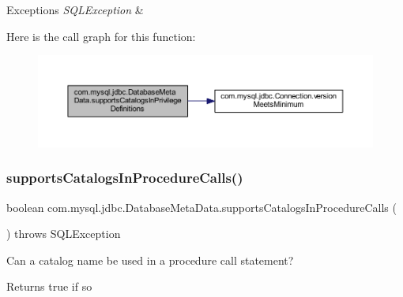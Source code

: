 \begin{DoxyExceptions}{Exceptions}
{\em S\+Q\+L\+Exception} & \\
\hline
\end{DoxyExceptions}
Here is the call graph for this function\+:
\nopagebreak
\begin{figure}[H]
\begin{center}
\leavevmode
\includegraphics[width=350pt]{classcom_1_1mysql_1_1jdbc_1_1_database_meta_data_abf583ff76a0cebb69d2483dc2227abe0_cgraph}
\end{center}
\end{figure}
\mbox{\label{classcom_1_1mysql_1_1jdbc_1_1_database_meta_data_a709d1b7e39661466b4742e85e40823d9}} 
\subsubsection{\texorpdfstring{supports\+Catalogs\+In\+Procedure\+Calls()}{supportsCatalogsInProcedureCalls()}}
{\footnotesize\ttfamily boolean com.\+mysql.\+jdbc.\+Database\+Meta\+Data.\+supports\+Catalogs\+In\+Procedure\+Calls (\begin{DoxyParamCaption}{ }\end{DoxyParamCaption}) throws S\+Q\+L\+Exception}

Can a catalog name be used in a procedure call statement?

\begin{DoxyReturn}{Returns}
true if so 
\end{DoxyReturn}

